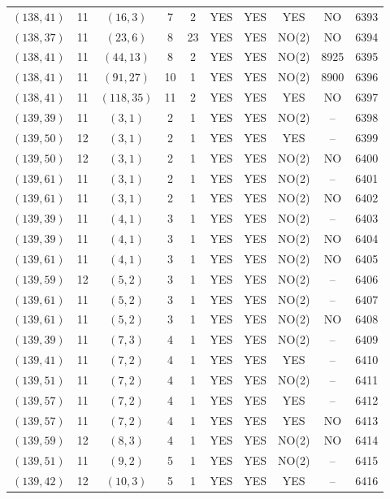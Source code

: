 \begin{longtable}{|c|c|c|c|c|c|c|c|c|c|}
$(138, 41)$ & 11 & $(16, 3)$ & 7 & 2 & YES & YES & YES & NO & 6393\\
$(138, 37)$ & 11 & $(23, 6)$ & 8 & 23 & YES & YES & NO(2) & NO & 6394\\
$(138, 41)$ & 11 & $(44, 13)$ & 8 & 2 & YES & YES & NO(2) & 8925 & 6395\\
$(138, 41)$ & 11 & $(91, 27)$ & 10 & 1 & YES & YES & NO(2) & 8900 & 6396\\
$(138, 41)$ & 11 & $(118, 35)$ & 11 & 2 & YES & YES & YES & NO & 6397\\
$(139, 39)$ & 11 & $(3, 1)$ & 2 & 1 & YES & YES & NO(2) & -- & 6398\\
$(139, 50)$ & 12 & $(3, 1)$ & 2 & 1 & YES & YES & YES & -- & 6399\\
$(139, 50)$ & 12 & $(3, 1)$ & 2 & 1 & YES & YES & NO(2) & NO & 6400\\
$(139, 61)$ & 11 & $(3, 1)$ & 2 & 1 & YES & YES & NO(2) & -- & 6401\\
$(139, 61)$ & 11 & $(3, 1)$ & 2 & 1 & YES & YES & NO(2) & NO & 6402\\
$(139, 39)$ & 11 & $(4, 1)$ & 3 & 1 & YES & YES & NO(2) & -- & 6403\\
$(139, 39)$ & 11 & $(4, 1)$ & 3 & 1 & YES & YES & NO(2) & NO & 6404\\
$(139, 61)$ & 11 & $(4, 1)$ & 3 & 1 & YES & YES & NO(2) & NO & 6405\\
$(139, 59)$ & 12 & $(5, 2)$ & 3 & 1 & YES & YES & NO(2) & -- & 6406\\
$(139, 61)$ & 11 & $(5, 2)$ & 3 & 1 & YES & YES & NO(2) & -- & 6407\\
$(139, 61)$ & 11 & $(5, 2)$ & 3 & 1 & YES & YES & NO(2) & NO & 6408\\
$(139, 39)$ & 11 & $(7, 3)$ & 4 & 1 & YES & YES & NO(2) & -- & 6409\\
$(139, 41)$ & 11 & $(7, 2)$ & 4 & 1 & YES & YES & YES & -- & 6410\\
$(139, 51)$ & 11 & $(7, 2)$ & 4 & 1 & YES & YES & NO(2) & -- & 6411\\
$(139, 57)$ & 11 & $(7, 2)$ & 4 & 1 & YES & YES & YES & -- & 6412\\
$(139, 57)$ & 11 & $(7, 2)$ & 4 & 1 & YES & YES & YES & NO & 6413\\
$(139, 59)$ & 12 & $(8, 3)$ & 4 & 1 & YES & YES & NO(2) & NO & 6414\\
$(139, 51)$ & 11 & $(9, 2)$ & 5 & 1 & YES & YES & NO(2) & -- & 6415\\
$(139, 42)$ & 12 & $(10, 3)$ & 5 & 1 & YES & YES & YES & -- & 6416\\

\end{longtable}
